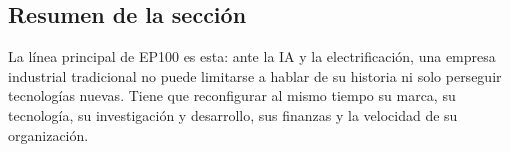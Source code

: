 \subsection{Resumen de la sección}

La línea principal de EP100 es esta: ante la IA y la electrificación, una empresa industrial tradicional no puede limitarse a hablar de su historia ni solo perseguir tecnologías nuevas. Tiene que reconfigurar al mismo tiempo su marca, su tecnología, su investigación y desarrollo, sus finanzas y la velocidad de su organización.
